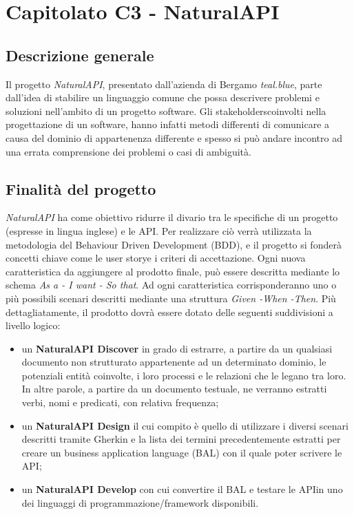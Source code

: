 \section{Capitolato C3 - NaturalAPI }

\subsection{Descrizione generale}
Il progetto \textit{NaturalAPI}, presentato dall’azienda di Bergamo \textit{teal.blue}, parte dall'idea di stabilire un linguaggio comune che possa descrivere problemi e soluzioni nell'ambito di un progetto software. Gli stakeholders\glo coinvolti nella progettazione di un software, hanno infatti metodi differenti di comunicare a causa del dominio di appartenenza differente e spesso si può andare incontro ad una errata comprensione dei problemi o casi di ambiguità.

\subsection{Finalità del progetto}
\textit{NaturalAPI} ha come obiettivo ridurre il divario tra le specifiche di un progetto (espresse in lingua inglese) e le API\glos. Per realizzare ciò verrà utilizzata la metodologia del Behaviour Driven Development (BDD)\glos, e il progetto si fonderà concetti chiave come le user story\glo e i criteri di accettazione\glo. Ogni nuova caratteristica da aggiungere al prodotto finale, può essere descritta mediante lo schema \textit{As a - I want - So that}. Ad ogni caratteristica corrisponderanno uno o più possibili scenari descritti mediante una struttura \textit{Given -When -Then}. Più dettagliatamente, il prodotto dovrà essere dotato delle seguenti suddivisioni a livello logico:  
\begin{itemize}
	\item un \textbf{NaturalAPI Discover} in grado di estrarre, a partire da un qualsiasi documento non strutturato appartenente ad un determinato dominio, le potenziali entità coinvolte, i loro processi e le relazioni che le legano tra loro. In altre parole, a partire da un documento testuale, ne verranno estratti verbi, nomi e predicati, con relativa frequenza;
	\item un \textbf{NaturalAPI Design} il cui compito è quello di utilizzare i diversi scenari descritti tramite Gherkin e la lista dei termini precedentemente estratti per creare un business application language (BAL) con il quale poter scrivere le API\glos;
	\item un \textbf{NaturalAPI Develop} con cui convertire il BAL e testare le API\glo in uno dei  linguaggi di programmazione/framework disponibili. 
\end{itemize}

